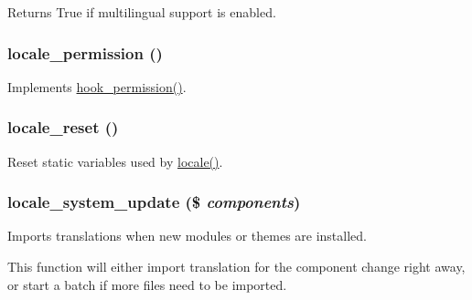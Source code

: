 \begin{DoxyReturn}{Returns}
True if multilingual support is enabled. 
\end{DoxyReturn}
\hypertarget{locale_8module_a79b804afde34020d86a208737eb9adc9}{
\subsubsection[{locale\_\-permission}]{\setlength{\rightskip}{0pt plus 5cm}locale\_\-permission ()}}
\label{locale_8module_a79b804afde34020d86a208737eb9adc9}
Implements \hyperlink{group__hooks_ga2b22b45f4925f2478412477bae329713}{hook\_\-permission()}. \hypertarget{locale_8module_add57084103803c08125d136031039cdc}{
\subsubsection[{locale\_\-reset}]{\setlength{\rightskip}{0pt plus 5cm}locale\_\-reset ()}}
\label{locale_8module_add57084103803c08125d136031039cdc}
Reset static variables used by \hyperlink{locale_8module_aa8108c8ecfcedbde1cf0d40606d5b2f5}{locale()}. \hypertarget{locale_8module_a407031bef7c41d5a8f94d3d60cab1fcb}{
\subsubsection[{locale\_\-system\_\-update}]{\setlength{\rightskip}{0pt plus 5cm}locale\_\-system\_\-update (\$ {\em components})}}
\label{locale_8module_a407031bef7c41d5a8f94d3d60cab1fcb}
Imports translations when new modules or themes are installed.

This function will either import translation for the component change right away, or start a batch if more files need to be imported.


